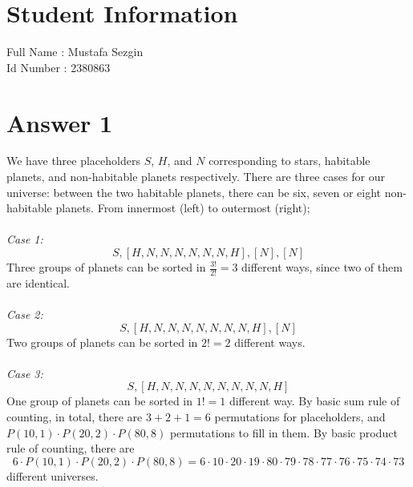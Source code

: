 \documentclass[11pt]{article}
\begin{document}
\section*{Student Information } 
Full Name : Mustafa Sezgin \\
Id Number : 2380863 \\

\section*{Answer 1}
We have three placeholders $S$, $H$, and $N$ corresponding to stars, habitable planets, and non-habitable planets respectively. There are three cases for our universe: between the two habitable planets, there can be six, seven or eight non-habitable planets. From innermost (left) to outermost (right); \\ \\
\textit{Case 1:}
\[ S, [H, N, N, N, N, N, N, H], [N], [N] \]
Three groups of planets can be sorted in $\frac{3!}{2!} = 3$ different ways, since two of them are identical. \\ \\
\textit{Case 2:}
\[ S, [H, N, N, N, N, N, N, N, H], [N] \]
Two groups of planets can be sorted in $2! = 2$ different ways. \\ \\
\textit{Case 3:}
\[ S, [H, N, N, N, N, N, N, N, N, H] \]
One group of planets can be sorted in $1! = 1$ different way. By basic sum rule of counting, in total, there are $3 + 2 + 1 = 6$ permutations for placeholders, and $P(10, 1) \cdot P(20, 2) \cdot P(80, 8)$ permutations to fill in them. By basic product rule of counting, there are
\[ 6 \cdot P(10, 1) \cdot P(20, 2) \cdot P(80, 8) = 6 \cdot 10 \cdot 20 \cdot 19 \cdot 80 \cdot 79 \cdot 78 \cdot 77 \cdot 76 \cdot 75 \cdot 74 \cdot 73 \]
different universes.
\end{document}
